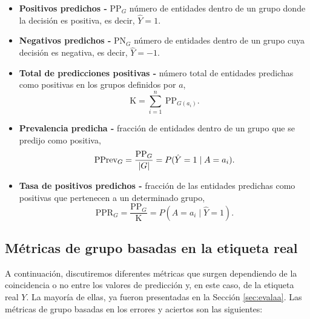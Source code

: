 \documentclass[oneside,openright,titlepage,numbers=noenddot,openany,headinclude,footinclude=true,
cleardoublepage=empty,abstractoff,BCOR=5mm,paper=a4,fontsize=12pt,main=spanish]{scrreprt}
\begin{document}
\begin{itemize}
    \item \textbf{Positivos predichos -} PP$_G$ número de entidades dentro de un grupo donde la decisión es positiva, es decir, $\hat{Y} = 1$.
    \item \textbf{Negativos predichos -} PN$_G$ número de entidades dentro de un grupo cuya decisión es negativa, es decir, $\hat{Y} = -1$.
    \item \textbf{Total de predicciones positivas -} número total de entidades predichas como positivas en los grupos definidos por $a$, $$\text{K} = \sum_{i=1}^{n} \  \text{PP}_{G(a_i)}.$$
    \item \textbf{Prevalencia predicha -} fracción de entidades dentro de un grupo que se predijo como positiva, $$\text{PPrev}_G = \frac{\text{PP}_G}{\left\lvert G\right\rvert} = P(\hat{Y}=1 \mid A=a_i).$$
    \item \textbf{Tasa de positivos predichos -} fracción de las entidades predichas como positivas que pertenecen a un determinado grupo, $$\text{PPR}_G = \frac{\text{PP}_G}{\text{K}} = P(A=a_i \mid \hat{Y}=1).$$
\end{itemize}

\subsection*{Métricas de grupo basadas en la etiqueta real}

\label{subsec:groupmetrics}

A continuación, discutiremos diferentes métricas que surgen dependiendo de la coincidencia o no entre los valores de predicción y, en este caso, de la etiqueta real $Y$. La mayoría de ellas, ya fueron presentadas en la Sección \ref{sec:evalaa}. Las métricas de grupo basadas en los errores y aciertos son las siguientes:
\end{document}
